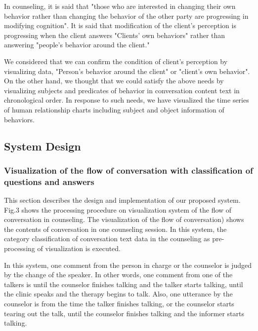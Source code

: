 \documentclass[review]{elsarticle}
\begin{document}
  In counseling, it is said that "those who are interested in changing their own behavior rather than changing the behavior of the other party are progressing in modifying cognition". It is said that modification of the client's perception is progressing when the client answers "Clients' own behaviors" rather than answering "people's behavior around the client."

  We considered that we can confirm the condition of client's perception by visualizing data, "Person's behavior around the client" or "client's own behavior". On the other hand, we thought that we could satisfy the above needs by visualizing subjects and predicates of behavior in conversation content text in chronological order. In response to such needs, we have visualized the time series of human relationship charts including subject and object information of behaviors.

\subsection{System Design}

\subsubsection{Visualization of the flow of conversation with classification of questions and answers}

  This section describes the design and implementation of our proposed system. Fig.3 shows the processing procedure on visualization system of the flow of conversation in counseling. The visualization of the flow of conversation) shows the contents of conversation in one counseling session. In this system, the category classification of conversation text data in the counseling as pre-processing of visualization is executed. 

  In this system, one comment from the person in charge or the counselor is judged by the change of the speaker. In other words, one comment from one of the talkers is until the counselor finishes talking and the talker starts talking, until the clinic speaks and the therapy begins to talk. Also, one utterance by the counselor is from the time the talker finishes talking, or the counselor starts tearing out the talk, until the counselor finishes talking and the informer starts talking.
\end{document}
